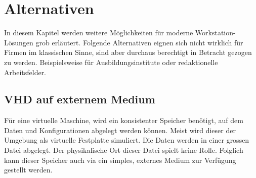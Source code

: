 





\section{Alternativen}
In diesem Kapitel werden weitere Möglichkeiten für moderne Workstation-Lösungen grob erläutert.
Folgende Alternativen eignen sich nicht wirklich für Firmen im klassischen Sinne, sind aber durchaus berechtigt in Betracht gezogen zu werden. Beispielsweise für Ausbildungsinstitute oder redaktionelle Arbeitsfelder.

\subsection{VHD auf externem Medium}
Für eine virtuelle Maschine, wird ein konsistenter Speicher benötigt, auf dem Daten und Konfigurationen abgelegt werden können.
Meist wird dieser der Umgebung als virtuelle Festplatte simuliert. Die Daten werden in einer grossen Datei abgelegt. Der physikalische Ort dieser Datei spielt keine Rolle.
Folglich kann dieser Speicher auch via ein simples, externes Medium zur Verfügung gestellt werden.

